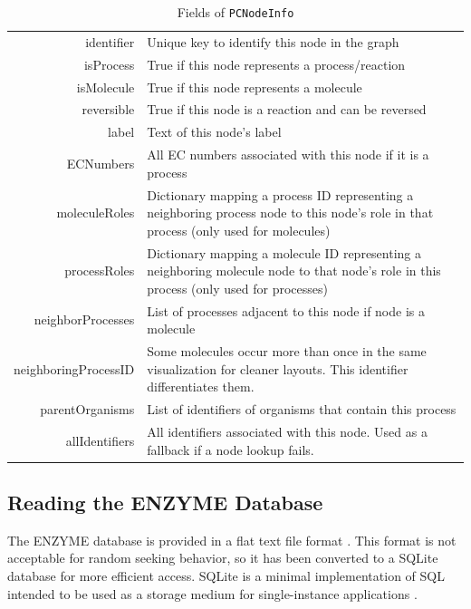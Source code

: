 \begin{table}[htbp]
\centering
\begin{tabular}{ r | p{4in}}
    identifier  & Unique key to identify this node in the graph \\
    isProcess   & True if this node represents a process/reaction \\
    isMolecule  & True if this node represents a molecule \\
    reversible  & True if this node is a reaction and can be reversed \\
    label       & Text of this node's label \\
    ECNumbers   & All EC numbers associated with this node if it is a process
    \\
    moleculeRoles   & Dictionary mapping a process ID representing a
                        neighboring process node to this node's role in that
                        process (only used for molecules) \\
    processRoles    & Dictionary mapping a molecule ID representing a
                        neighboring molecule node to that node's role in this
                        process (only used for processes) \\
    neighborProcesses   & List of processes adjacent to this node if node is a
                            molecule \\
    neighboringProcessID    & Some molecules occur more than once in the same
                                visualization for cleaner layouts. This
                                identifier differentiates them. \\
    parentOrganisms & List of identifiers of organisms that contain this process
    \\
    allIdentifiers  & All identifiers associated with this node. Used as a
                        fallback if a node lookup fails. \\
\end{tabular}
    \caption{Fields of \texttt{PCNodeInfo}}
    \label{fig:kegg_node_info_fields}
\end{table}

\subsection{Reading the ENZYME Database}
\label{sect:kegg_impl_enzyme}

The ENZYME database is provided in a flat text file format
\cite{enzyme:enzuser}. This format is not acceptable for random seeking
behavior, so it has been converted to a SQLite database \cite{sqlite:main} for
more efficient access. SQLite is a minimal implementation of SQL intended to be
used as a storage medium for single-instance applications \cite{sqlite:main}.

